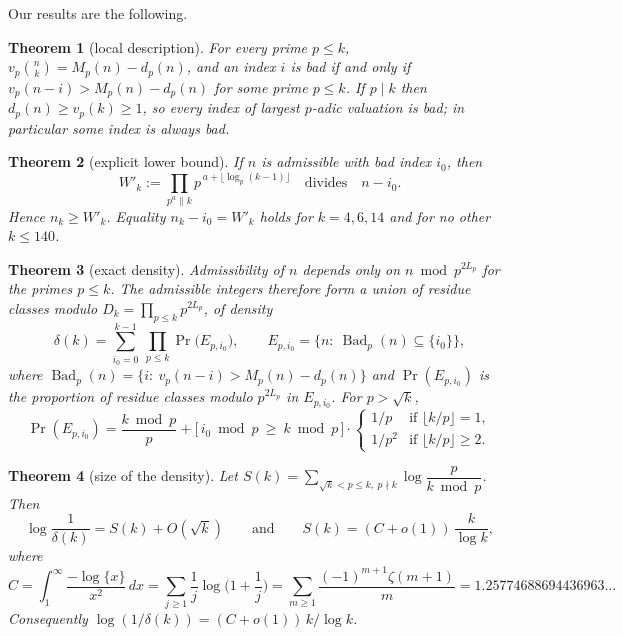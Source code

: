 \documentclass[11pt]{amsart}
\newtheorem{theorem}{Theorem}[section]
\theoremstyle{remark}
\DeclareMathOperator{\Bad}{Bad}
\renewcommand{\Pr}{\operatorname{Pr}}
\begin{document}
Our results are the following.

\begin{theorem}[local description]\label{thm:local}
For every prime $p\le k$, $v_p\binom nk=M_p(n)-d_p(n)$, and an index $i$ is bad if and only if $v_p(n-i)>M_p(n)-d_p(n)$ for some prime $p\le k$. If $p\mid k$ then $d_p(n)\ge v_p(k)\ge1$, so every index of largest $p$-adic valuation is bad; in particular some index is always bad.
\end{theorem}

\begin{theorem}[explicit lower bound]\label{thm:lower}
If $n$ is admissible with bad index $i_0$, then
\[W'_k:=\prod_{p^a\|k}p^{\,a+\lfloor\log_p(k-1)\rfloor}\quad\text{divides}\quad n-i_0.\]
Hence $n_k\ge W'_k$. Equality $n_k-i_0=W'_k$ holds for $k=4,6,14$ and for no other $k\le140$.
\end{theorem}

\begin{theorem}[exact density]\label{thm:density}
Admissibility of $n$ depends only on $n\bmod p^{2L_p}$ for the primes $p\le k$. The admissible integers therefore form a union of residue classes modulo $D_k=\prod_{p\le k}p^{2L_p}$, of density
\begin{equation}\label{eq:delta}
\delta(k)=\sum_{i_0=0}^{k-1}\ \prod_{p\le k}\Pr\big(E_{p,i_0}\big),\qquad E_{p,i_0}=\{n:\ \Bad_p(n)\subseteq\{i_0\}\},
\end{equation}
where $\Bad_p(n)=\{i:\ v_p(n-i)>M_p(n)-d_p(n)\}$ and $\Pr(E_{p,i_0})$ is the proportion of residue classes modulo $p^{2L_p}$ in $E_{p,i_0}$. For $p>\sqrt k$,
\begin{equation}\label{eq:closed}
\Pr(E_{p,i_0})=\frac{k\bmod p}{p}+\big[\,i_0\bmod p\ \ge\ k\bmod p\,\big]\cdot\begin{cases}1/p&\text{if }\lfloor k/p\rfloor=1,\\ 1/p^2&\text{if }\lfloor k/p\rfloor\ge2.\end{cases}
\end{equation}
\end{theorem}

\begin{theorem}[size of the density]\label{thm:asymp}
Let $S(k)=\sum_{\sqrt k<p\le k,\ p\nmid k}\log\dfrac{p}{k\bmod p}$. Then
\[\log\frac1{\delta(k)}=S(k)+O(\sqrt k)\qquad\text{and}\qquad S(k)=(C+o(1))\,\frac{k}{\log k},\]
where
\[C=\int_1^\infty\frac{-\log\{x\}}{x^2}\,dx=\sum_{j\ge1}\frac1j\log\Big(1+\frac1j\Big)=\sum_{m\ge1}\frac{(-1)^{m+1}\zeta(m+1)}{m}=1.25774688694436963\ldots\]
Consequently $\log(1/\delta(k))=(C+o(1))\,k/\log k$.
\end{theorem}
\end{document}
